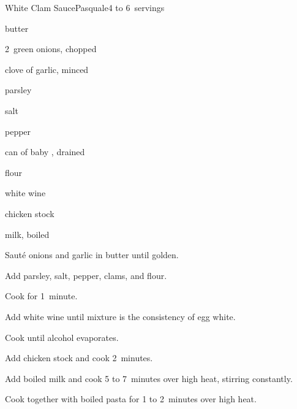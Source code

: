 \begin{recipe}{White Clam Sauce}{Pasquale}{4 to 6~servings}

\begin{ingredients}
\item {} butter
\item 2~green onions, chopped
\item clove of garlic, minced
\item parsley
\item salt
\item pepper
\item {} can of baby , drained
\item {} flour
\item white wine
\item {} chicken stock
\item {} milk, boiled
\end{ingredients}

\begin{directions}
\item Sauté onions and garlic in butter until golden.
\item Add parsley, salt, pepper, clams, and flour.
\item Cook for 1~minute.
\item Add white wine until mixture is the consistency of egg white.
\item Cook until alcohol evaporates.
\item Add chicken stock and cook 2~minutes.
\item Add boiled milk and cook 5 to 7~minutes over high heat, stirring constantly.
\item Cook together with boiled pasta for 1 to 2~minutes over high heat.
\end{directions}

\end{recipe}
